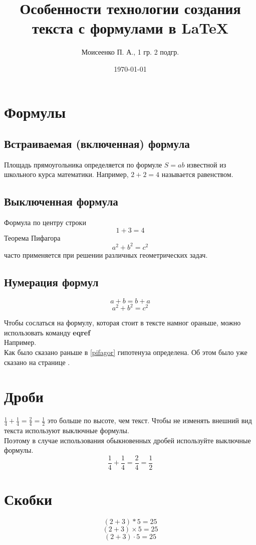 \documentclass[a4paper,12pt]{article} %
\author{Моисеенко П. А., 1 гр. 2 подгр.}
\title{Особенности технологии создания текста с формулами в \LaTeX{}}
\date{\today}
\begin{document}
\maketitle
\newpage
\section{Формулы}
\subsection{Встраиваемая (включенная) формула}
Площадь прямоугольника определяется по формуле $ S=ab $ известной из школьного курса математики. Например, $ 2+2=4 $ называется равенством.

\subsection{Выключенная формула}
Формула по центру строки $$ 1+3=4 $$
Теорема Пифагора $$ a^2+b^2=c^2 $$ часто применяется при решении различных геометрических задач.

\subsection{Нумерация формул}
\begin{equation}
a+b=b+a
\end{equation}
\begin{equation} \label{pifagor}
a^2+b^2=c^2
\end{equation}

Чтобы сослаться на формулу, которая стоит в тексте намног ораньше, можно использовать команду \textbf{eqref}\\
Например.\\
Как было сказано раньше в
\eqref{pifagor} гипотенуза определена.
Об этом было уже сказано на странице \pageref{pifagor}.

\section{Дроби}
$\frac{1}{4}+\frac{1}{4}=\frac{2}{4}=\frac{1}{2}$ это больше по высоте, чем текст. Чтобы не изменять внешний вид текста используют выключные формулы.\\

Поэтому в случае использования обыкновенных дробей используйте выключные формулы.
$$\frac{1}{4}+\frac{1}{4}=\frac{2}{4}=\frac{1}{2}$$

\section{Скобки}
$$ (2+3)*5=25 $$
$$ (2+3) \times 5=25 $$
$$ (2+3) \cdot 5=25 $$
\end{document}
